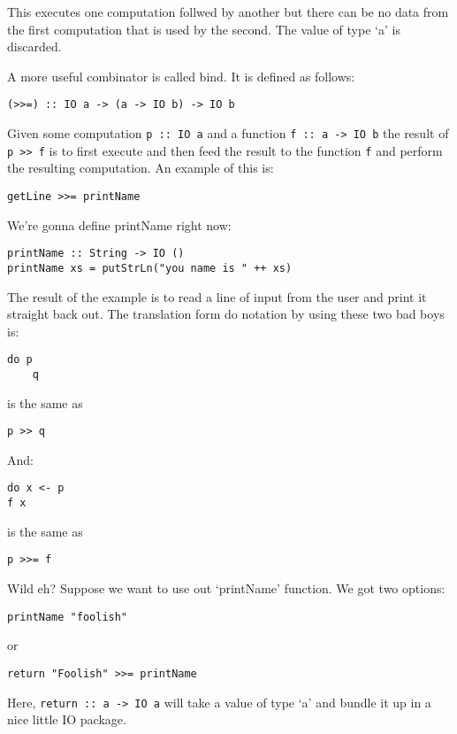 \documentclass[11pt,a4paper,titlepage,dvipsnames,cmyk]{scrartcl}
\begin{document}
This executes one computation follwed by another but there can be no data
from the first computation that is used by the second. The value of type
`a' is discarded.

A more useful combinator is called bind. It is defined as follows:
\begin{lstlisting}[style=B]
(>>=) :: IO a -> (a -> IO b) -> IO b
\end{lstlisting}

Given some computation \lstinline|p :: IO a| and a function
\lstinline|f :: a -> IO b| the result of \lstinline|p >> f| is to first
execute and then feed the result to the function \lstinline|f| and perform
the resulting computation. An example of this is:
\begin{lstlisting}[style=B]
getLine >>= printName
\end{lstlisting}

We're gonna define printName right now:
\begin{lstlisting}[style=B]
printName :: String -> IO ()
printName xs = putStrLn("you name is " ++ xs)
\end{lstlisting}

The result of the example is to read a line of input from the user and
print it straight back out. The translation form do notation by using
these two bad boys is:
\begin{lstlisting}[style=B]
do p
    q
\end{lstlisting}
is the same as
\begin{lstlisting}[style=B]
p >> q
\end{lstlisting}

And:
\begin{lstlisting}[style=B]
do x <- p
f x
\end{lstlisting}
is the same as

\begin{lstlisting}[style=B]
p >>= f
\end{lstlisting}

Wild eh? Suppose we want to use out `printName' function. We got two
options:
\begin{lstlisting}[style=B]
printName "foolish"
\end{lstlisting}

or
\begin{lstlisting}[style=B]
return "Foolish" >>= printName
\end{lstlisting}

Here, \lstinline|return :: a -> IO a| will take a value of type `a' and
bundle it up in a nice little IO package.
\end{document}
